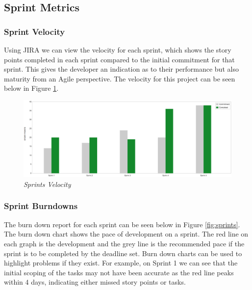 \subsection{Sprint Metrics}

\subsubsection{Sprint Velocity}
Using JIRA we can view the velocity for each sprint, which shows the story points completed in each sprint compared to the initial commitment for that sprint. This gives the developer an indication as to their performance but also maturity from an Agile perspective. The velocity for this project can be seen below in Figure \ref{fig:velocity}.

\begin{figure}[!ht]
\centering
\includegraphics*[width=\textwidth]{images/velocity}
\caption{\em Sprints Velocity}
\label{fig:velocity}
\end{figure}

\subsubsection{Sprint Burndowns}

The burn down report for each sprint can be seen below in Figure \ref{fig:sprints}. The burn down chart shows the pace of development on a sprint. The red line on each graph is the development and the grey line is the recommended pace if the sprint is to be completed by the deadline set. Burn down charts can be used to highlight problems if they exist. For example, on Sprint 1 we can see that the initial scoping of the tasks may not have been accurate as the red line peaks within 4 days, indicating either missed story points or tasks.

